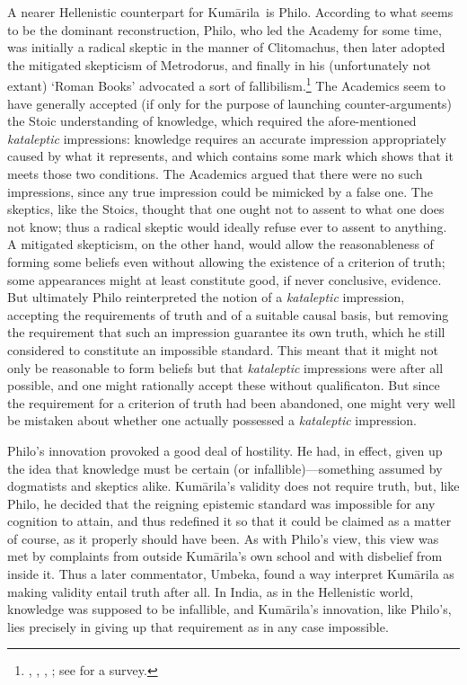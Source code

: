 \documentclass[11pt,letterpaper,oneside]{amsart}
\newcommand{\e}{\emph}
\newcommand{\kum}{Kum\={a}rila}
\begin{document}
A nearer Hellenistic counterpart for \kum\ is Philo. According to what seems to be the dominant reconstruction, Philo, who led the Academy for some time, was initially a radical skeptic in the manner of Clitomachus, then later adopted the mitigated skepticism of Metrodorus, and finally in his (unfortunately not extant) `Roman Books' advocated a sort of fallibilism.\footnote{\citet{frede1987sceptic}, \citet{barnes1989antiochus}, \citet{striker1997academics}, \citet{brittain2001philo}; see \citet{sep-philo-larissa} for a survey.} The Academics seem to have generally accepted (if only for the purpose of launching counter-arguments) the Stoic understanding of knowledge, which required the afore-mentioned \e{kataleptic} impressions: knowledge requires an accurate impression appropriately caused by what it represents, and which contains some mark which shows that it meets those two conditions. The Academics argued that there were no such impressions, since any true impression could be mimicked by a false one. The skeptics, like the Stoics, thought that one ought not to assent to what one does not know; thus a radical skeptic would ideally refuse ever to assent to anything. A mitigated skepticism, on the other hand, would allow the reasonableness of forming some beliefs even without allowing the existence of a criterion of truth; some appearances might at least constitute good, if never conclusive, evidence. But ultimately Philo reinterpreted the notion of a \e{kataleptic} impression, accepting the requirements of truth and of a suitable causal basis, but removing the requirement that such an impression guarantee its own truth, which he still considered to constitute an impossible standard. This meant that it might not only be reasonable to form beliefs but that \e{kataleptic} impressions were after all possible, and one might rationally accept these without qualificaton. But since the requirement for a criterion of truth had been abandoned, one might very well be mistaken about whether one actually possessed a \e{kataleptic} impression.

Philo's innovation provoked a good deal of hostility. He had, in effect, given up the idea that knowledge must be certain (or infallible)---something assumed by dogmatists and skeptics alike. Kum\=arila's validity does not require truth, but, like Philo, he decided that the reigning epistemic standard was impossible for any cognition to attain, and thus redefined it so that it could be claimed as a matter of course, as it properly should have been. As with Philo's view, this view was met by complaints from outside \kum's own school and with disbelief from inside it. Thus a later commentator, Umbeka, found a way interpret Kum\=arila as making validity entail truth after all. In India, as in the Hellenistic world, knowledge was supposed to be infallible, and Kum\=arila's innovation, like Philo's, lies precisely in giving up that requirement as in any case impossible.
\end{document}
